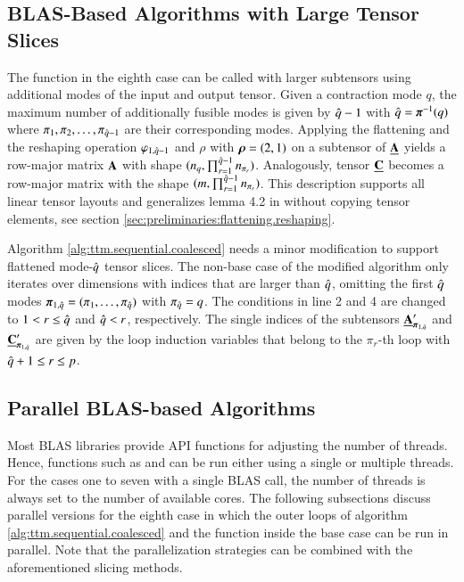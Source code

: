 \subsection{BLAS-Based Algorithms with Large Tensor Slices}
\label{sec:design:blas.based.algorithm.subtensors}
The  function in the eighth case can be called with larger subtensors using additional modes of the input and output tensor.
Given a contraction mode $q$, the maximum number of additionally fusible modes is given by $\hat{q}-1$ with $\hat{q} = \boldsymbol{\pi}^{-1}(q)$ where $\pi_1,\pi_2,\dots,\pi_{\hat{q}-1}$ are their corresponding modes.
Applying the flattening and the reshaping operation $\varphi_{1,\hat{q}-1}$  and $\rho$ with $\boldsymbol{\rho} = (2,1)$ on a subtensor of $\underline{\mathbf{A}}$ yields a row-major matrix $\mathbf{A}$ with shape $(n_q,\prod_{r=1}^{\hat{q}-1} n_{\pi_r})$.
Analogously, tensor $\underline{\mathbf{C}}$ becomes a row-major matrix with the shape $(m, \prod_{r=1}^{\hat{q}-1} n_{\pi_r})$.
This description supports all linear tensor layouts and generalizes lemma 4.2 in \cite{li:2015:input} without copying tensor elements, see section \ref{sec:preliminaries:flattening.reshaping}.

Algorithm \ref{alg:ttm.sequential.coalesced} needs a minor modification to support flattened mode-$\hat{q}$ tensor slices.
The non-base case of the modified algorithm only iterates over dimensions with indices that are larger than $\hat{q}$, omitting the first $\hat{q}$ modes $\boldsymbol{\pi}_{1,\hat{q}} = (\pi_1, \dots, \pi_{\hat{q}})$ with $\pi_{\hat{q}} = q$.
The conditions in line 2 and 4 are changed to $1 < r \leq \hat{q}$ and $\hat{q} < r$, respectively.
The single indices of the subtensors $\underline{\mathbf{A}}_{\boldsymbol{\pi}_{1,\hat{q}}}'$ and $\underline{\mathbf{C}}_{\boldsymbol{\pi}_{1,\hat{q}}}'$ are given by the loop induction variables that belong to the $\pi_r$-th loop with $\hat{q}+1 \leq r \leq p$.
 
\subsection{Parallel BLAS-based Algorithms}
\label{subsec:parallel.multi-loops}
Most BLAS libraries provide API functions for adjusting the number of threads.
Hence, functions such as  and  can be run either using a single or multiple threads.
For the cases one to seven with a single BLAS call, the number of threads is always set to the number of available cores.
The following subsections discuss parallel versions for the eighth case in which the outer loops of algorithm \ref{alg:ttm.sequential.coalesced} and the  function inside the base case can be run in parallel.
Note that the parallelization strategies can be combined with the aforementioned slicing methods.

